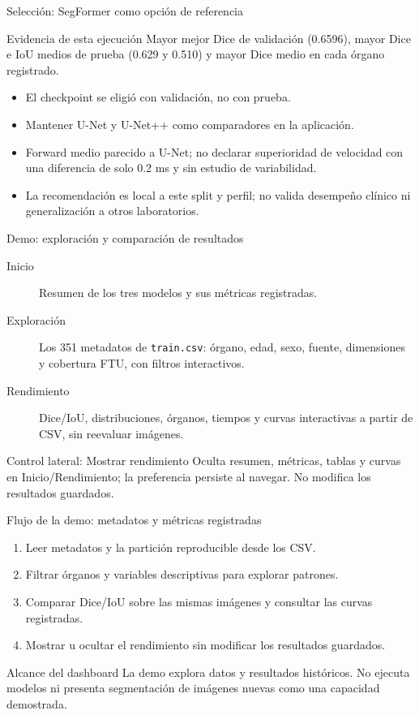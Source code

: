 \documentclass[aspectratio=169,11pt]{beamer}
\begin{document}
\begin{frame}{Selección: SegFormer como opción de referencia}
  \begin{block}{Evidencia de esta ejecución}
    Mayor mejor Dice de validación (0.6596), mayor Dice e IoU medios de prueba
    (0.629 y 0.510) y mayor Dice medio en cada órgano registrado.
  \end{block}
  \begin{itemize}
    \item El checkpoint se eligió con validación, no con prueba.
    \item Mantener U-Net y U-Net++ como comparadores en la aplicación.
    \item Forward medio parecido a U-Net; no declarar superioridad de velocidad
          con una diferencia de solo 0.2 ms y sin estudio de variabilidad.
    \item La recomendación es local a este split y perfil; no valida desempeño
          clínico ni generalización a otros laboratorios.
  \end{itemize}
\end{frame}

\begin{frame}{Demo: exploración y comparación de resultados}
  \begin{description}
    \item[Inicio] Resumen de los tres modelos y sus métricas registradas.
    \item[Exploración] Los 351 metadatos de \texttt{train.csv}: órgano, edad,
      sexo, fuente, dimensiones y cobertura FTU, con filtros interactivos.
    \item[Rendimiento] Dice/IoU, distribuciones, órganos, tiempos y curvas
      interactivas a partir de CSV, sin reevaluar imágenes.
  \end{description}
  \begin{block}{Control lateral: Mostrar rendimiento}
    Oculta resumen, métricas, tablas y curvas en Inicio/Rendimiento;
    la preferencia persiste al navegar. No modifica los resultados guardados.
  \end{block}
\end{frame}

\begin{frame}{Flujo de la demo: metadatos y métricas registradas}
  \begin{enumerate}
    \item Leer metadatos y la partición reproducible desde los CSV.
    \item Filtrar órganos y variables descriptivas para explorar patrones.
    \item Comparar Dice/IoU sobre las mismas imágenes y consultar las curvas registradas.
    \item Mostrar u ocultar el rendimiento sin modificar los resultados guardados.
  \end{enumerate}
  \begin{block}{Alcance del dashboard}
    La demo explora datos y resultados históricos. No ejecuta modelos ni presenta
    segmentación de imágenes nuevas como una capacidad demostrada.
  \end{block}
\end{frame}
\end{document}
